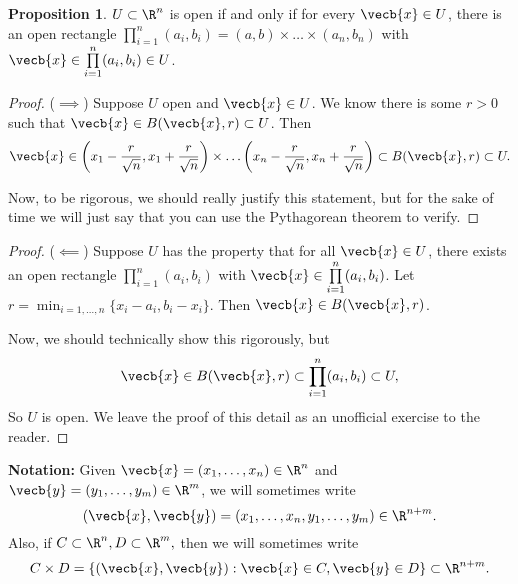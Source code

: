 \documentclass[a5paper]{article}
\theoremstyle{definition}%
\newtheorem{proposition}[theorem]{Proposition}
\numberwithin{exercise}{section}
\theoremstyle{remark}%
\begin{document}
\begin{highlight}
\begin{proposition}
$U\subset \R^n$ is open if and only if for every $\vecb{x}\in U$, there is an open rectangle $\prod\limits_{i=1}^n(a_i,b_i)=(a,b)\times\ldots\times(a_n,b_n)$ with $\vecb{x}\in \prod\limits_{i=1}^n(a_i,b_i) \in U$. 
\end{proposition}
\end{highlight}
\begin{proof}($\implies$)
Suppose $U$ open and $\vecb{x}\in U$. We know there is some $r>0$ such that $\vecb{x} \in B(\vecb{x},r) \subset U$. Then 
$$\vecb{x}\in\left(x_1-\frac{r}{\sqrt{n}},x_1+\frac{r}{\sqrt{n}}\right)\times \ldots \left(x_n-\frac{r}{\sqrt{n}},x_n+\frac{r}{\sqrt{n}}\right)\subset B(\vecb{x},r)\subset U.$$

Now, to be rigorous, we should really justify this statement, but for the sake of time we will just say that you can use the Pythagorean theorem to verify.
\end{proof}
\begin{proof}($\impliedby$)
Suppose $U$ has the property that for all $\vecb{x}\in U$, there exists an open rectangle $\prod\limits_{i=1}^n(a_i,b_i)$ with $\vecb{x}\in\prod\limits_{i=1}^n(a_i,b_i)$. Let $r=\min_{i=1,\ldots, n}\{x_i-a_i, b_i-x_i\}$. Then $\vecb{x}\in B(\vecb{x},r)$. 

Now, we should technically show this rigorously, but $$\vecb{x}\in B(\vecb{x},r)\subset \prod\limits_{i=1}^n(a_i,b_i) \subset U,$$
So $U$ is open. We leave the proof of this detail as an unofficial exercise to the reader. 
\end{proof}

\noindent \textbf{Notation:} Given $\vecb{x}=(x_1, \ldots, x_n)\in \R^n$ and $\vecb{y}=(y_1, \ldots, y_m)\in \R^m$, we will sometimes write 
$$(\vecb{x},\vecb{y})=(x_1, \ldots, x_n, y_1, \ldots, y_m)\in \R^{n+m}.$$
Also, if $C\subset \R^n, D\subset \R^m,$ then we will sometimes write 
$$C\times D=\{(\vecb{x},\vecb{y}):\vecb{x}\in C, \vecb{y}\in D\}\subset \R^{n+m}.$$
\end{document}
